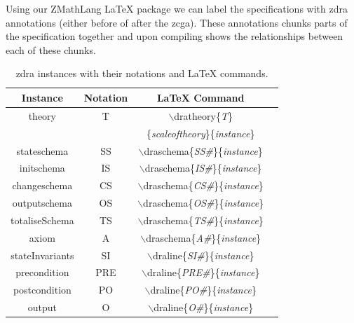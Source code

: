 Using our ZMathLang \LaTeX{} package we can label the specifications with \gls{zdra} annotations (either before of after the \gls{zcga}). These annotations chunks parts of the specification together and upon compiling shows the relationships between each of these chunks.

\begin{table}[H]
\begin{tabular}{| c | c | c | c |}
\hline
\textbf{Instance} & \textbf{Notation} & \textbf{\LaTeX{} Command}  \\
\hline
theory & T & $\backslash$dratheory\{\textit{T}\}\\
& & \{\textit{scaleoftheory}\}\{\textit{instance}\}  \\
\hline
stateschema & SS & $\backslash$draschema\{\textit{SS\#}\}\{\textit{instance}\}  \\
\hline
initschema & IS & $\backslash$draschema\{\textit{IS\#}\}\{\textit{instance}\}  \\
\hline
changeschema & CS & $\backslash$draschema\{\textit{CS\#}\}\{\textit{instance}\}  \\
\hline
outputschema & OS & $\backslash$draschema\{\textit{OS\#}\}\{\textit{instance}\}  \\
\hline
totaliseSchema & TS & $\backslash$draschema\{\textit{TS\#}\}\{\textit{instance}\}  \\
\hline
axiom & A  & $\backslash$draschema\{\textit{A\#}\}\{\textit{instance}\}  \\
\hline
stateInvariants & SI & $\backslash$draline\{\textit{SI\#}\}\{\textit{instance}\}  \\
\hline
precondition & PRE & $\backslash$draline\{\textit{PRE\#}\}\{\textit{instance}\}  \\
\hline
postcondition & PO  & $\backslash$draline\{\textit{PO\#}\}\{\textit{instance}\}  \\
\hline
output & O  & $\backslash$draline\{\textit{O\#}\}\{\textit{instance}\}  \\
\hline
\end{tabular}
\caption{\label{tab:instances} \gls{zdra} instances with their notations and \LaTeX{} commands.}
\end{table}

